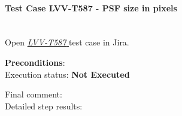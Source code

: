 \documentclass[DM,lsstdraft,STR,toc]{lsstdoc}
\begin{document}
    \paragraph{Test Case LVV-T587 - PSF size in pixels
 }\mbox{}\\

Open  \href{https://jira.lsstcorp.org/secure/Tests.jspa#/testCase/LVV-T587}{\textit{ LVV-T587 } }
test case in Jira.

    

    \textbf{ Preconditions}:\\
    

    Execution status: {\bf Not Executed }

    Final comment:\\


    Detailed step results:
\end{document}
